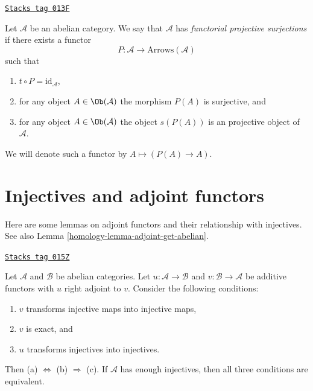 \begin{definition}
\label{homology-definition-functorial-projective-surjections}
\href{https://stacks.math.columbia.edu/tag/013F}{\texttt{Stacks tag 013F}}

Let $\mathcal{A}$ be an abelian category.
We say that $\mathcal{A}$ has {\it functorial projective surjections}
if there exists a functor
$$
P : \mathcal{A} \longrightarrow \text{Arrows}(\mathcal{A})
$$
such that
\begin{enumerate}
\item $t \circ P = \text{id}_\mathcal{A}$,
\item for any object $A \in \Ob(\mathcal{A})$
the morphism $P(A)$ is surjective, and
\item for any object $A \in \Ob(\mathcal{A})$
the object $s(P(A))$ is an projective object of $\mathcal{A}$.
\end{enumerate}
We will denote such a functor by
$A \mapsto (P(A) \to A)$.
\end{definition}

\section{Injectives and adjoint functors}
\label{homology-section-adjoint}
Here are some lemmas on adjoint functors and their relationship with
injectives. See also Lemma \ref{homology-lemma-adjoint-get-abelian}.

\begin{lemma}
\label{homology-lemma-adjoint-preserve-injectives}
\href{https://stacks.math.columbia.edu/tag/015Z}{\texttt{Stacks tag 015Z}}


Let $\mathcal{A}$ and $\mathcal{B}$ be abelian categories.
Let $u : \mathcal{A} \to \mathcal{B}$ and
$v : \mathcal{B} \to \mathcal{A}$ be additive functors with
$u$ right adjoint to $v$. Consider the following conditions:
\begin{enumerate}
\item[(a)] $v$ transforms injective maps into injective maps,
\item[(b)] $v$ is exact, and
\item[(c)] $u$ transforms injectives into injectives.
\end{enumerate}
Then (a) $\Leftrightarrow$ (b) $\Rightarrow$ (c). If $\mathcal{A}$
has enough injectives, then all three conditions are equivalent.
\end{lemma}


